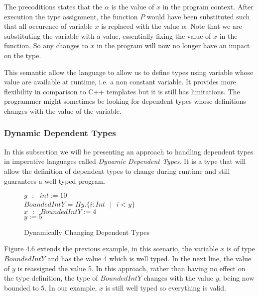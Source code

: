 \documentclass[a4paper,12pt]{report}
\begin{document}
\par
The precoditions states that the $\alpha$ is the value of $x$ in the 
program context. After execution the type assignment, 
the function $P$ would have been substituted 
such that all occurence of variable $x$ is replaced with the value $\alpha$. Note 
that we are substituting the variable with a value, essentially fixing the value 
of $x$ in the function. So any changes to $x$ in the program will now no longer 
have an impact on the type.

\par
This semantic allow the language to allow us to define types using variable 
whose value are available at runtime, i.e. a non constant variable. It provides 
more flexibility in comparison to C++ templates but it is still has limitations. The 
programmer might sometimes be looking for dependent types whose definitions 
changes with the value of the variable. 

\subsubsection{Dynamic Dependent Types}
In this subsection we will be presenting an approach to handling dependent types 
in imperative languages called \textit{Dynamic Dependent Types}. It is a type 
that will allow the definition of dependent types to change during runtime and 
still guarantees a well-typed program. 


\begin{figure} [H]
  \begin{center}
    $y\text{ }:\text{ }int := 10$ \\
    $BoundedIntY$ = $\Pi y. \{i : Int\text{ }|\text{ }i < y\}$ \\ 
    $x\text{ }:\text{ }BoundedIntY := 4$ \\
    $y := 5$ \\
  \end{center}
  \caption{Dynamically Changing Dependent Types}
\end{figure}

Figure 4.6 extends the previous example, in this scenario, the variable $x$ is 
of type $BoundedIntY$ and has the value 4 which is well typed. In the next line, 
the value of $y$ is reassigned the value 5. In this approach, rather than having 
no effect on the type definition, the type of $BoundedIntY$ changes with the 
value $y$, being now bounded to $5$. In our example, $x$ is still well typed so 
everything is valid. 
\end{document}
